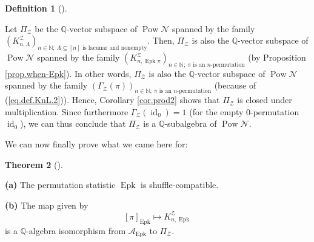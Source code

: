 \documentclass[numbers=enddot,12pt,final,onecolumn,notitlepage]{scrartcl}%
\theoremstyle{definition}
\newtheorem{theo}{Theorem}[section]
\newenvironment{theorem}[1][]
{\begin{theo}[#1]\begin{leftbar}}
{\end{leftbar}\end{theo}}
\newtheorem{defi}[theo]{Definition}
\newenvironment{definition}[1][]
{\begin{defi}[#1]\begin{leftbar}}
{\end{leftbar}\end{defi}}
\begin{document}
\begin{definition}
Let $\Pi_{\mathcal{Z}}$ be the $\mathbb{Q}$-vector subspace of
$\operatorname*{Pow}\mathcal{N}$ spanned by the family $\left(  K_{n,\Lambda
}^{\mathcal{Z}}\right)  _{n\in\mathbb{N};\ \Lambda\subseteq\left[  n\right]
\text{ is lacunar and nonempty}}$. Then, $\Pi_{\mathcal{Z}}$ is also the
$\mathbb{Q}$-vector subspace of $\operatorname*{Pow}\mathcal{N}$ spanned by
the family $\left(  K_{n,\operatorname*{Epk}\pi}^{\mathcal{Z}}\right)
_{n\in\mathbb{N};\ \pi\text{ is an }n\text{-permutation}}$ (by Proposition
\ref{prop.when-Epk}). In other words, $\Pi_{\mathcal{Z}}$ is also the
$\mathbb{Q}$-vector subspace of $\operatorname*{Pow}\mathcal{N}$ spanned by
the family $\left(  \Gamma_{\mathcal{Z}}\left(  \pi\right)  \right)
_{n\in\mathbb{N};\ \pi\text{ is an }n\text{-permutation}}$ (because of
(\ref{eq.def.KnL.2})). Hence, Corollary \ref{cor.prod2} shows that
$\Pi_{\mathcal{Z}}$ is closed under multiplication. Since furthermore
$\Gamma_{\mathcal{Z}}\left(  \operatorname*{id}\nolimits_{0}\right)  =1$ (for
the empty $0$-permutation $\operatorname*{id}\nolimits_{0}$), we can thus
conclude that $\Pi_{\mathcal{Z}}$ is a $\mathbb{Q}$-subalgebra of
$\operatorname*{Pow}\mathcal{N}$.
\end{definition}

We can now finally prove what we came here for:

\begin{theorem}
\label{thm.Epk.sh-co}\textbf{(a)} The permutation statistic
$\operatorname*{Epk}$ is shuffle-compatible.

\textbf{(b)} The map given by%
\[
\left[  \pi\right]  _{\operatorname*{Epk}}\mapsto K_{n,\operatorname*{Epk}%
}^{\mathcal{Z}}%
\]
is a $\mathbb{Q}$-algebra isomorphism from $\mathcal{A}_{\operatorname*{Epk}}$
to $\Pi_{\mathcal{Z}}$.
\end{theorem}
\end{document}

